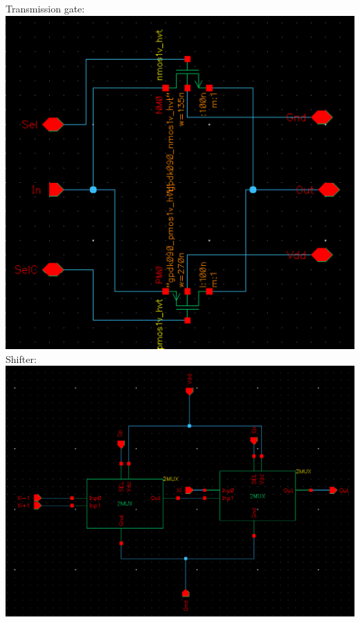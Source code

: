 \documentclass[12pt]{article}
\begin{document}
  Transmission gate:\\
  \includegraphics[scale=0.4]{tgate.png}
  \\

  Shifter:\\
  \includegraphics[scale=0.4]{shift.png}
  \\
\end{document}
